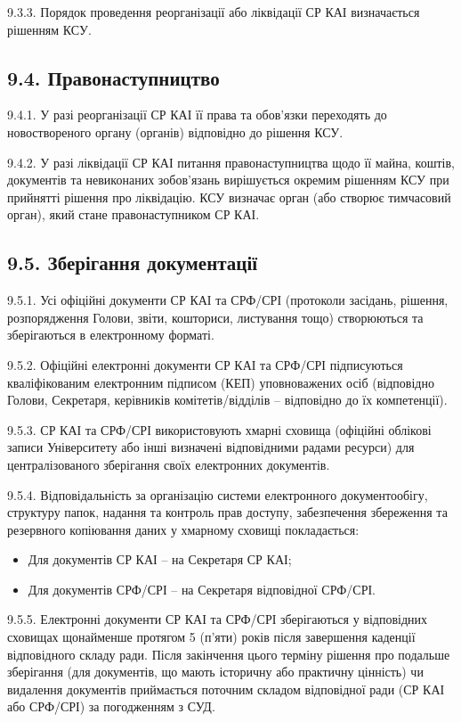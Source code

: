     9.3.3. Порядок проведення реорганізації або ліквідації СР КАІ визначається рішенням КСУ.

\subsection*{9.4. Правонаступництво}
    9.4.1. У разі реорганізації СР КАІ її права та обов'язки переходять до новоствореного органу (органів) відповідно до рішення КСУ.

    9.4.2. У разі ліквідації СР КАІ питання правонаступництва щодо її майна, коштів, документів та невиконаних зобов'язань вирішується окремим рішенням КСУ при прийнятті рішення про ліквідацію. КСУ визначає орган (або створює тимчасовий орган), який стане правонаступником СР КАІ.

\subsection*{9.5. Зберігання документації}
    9.5.1. Усі офіційні документи СР КАІ та СРФ/СРІ (протоколи засідань, рішення, розпорядження Голови, звіти, кошториси, листування тощо) створюються та зберігаються в електронному форматі.

    9.5.2. Офіційні електронні документи СР КАІ та СРФ/СРІ підписуються кваліфікованим електронним підписом (КЕП) уповноважених осіб (відповідно Голови, Секретаря, керівників комітетів/відділів – відповідно до їх компетенції).

    9.5.3. СР КАІ та СРФ/СРІ використовують хмарні сховища (офіційні облікові записи Університету або інші визначені відповідними радами ресурси) для централізованого зберігання своїх електронних документів.

    9.5.4. Відповідальність за організацію системи електронного документообігу, структуру папок, надання та контроль прав доступу, забезпечення збереження та резервного копіювання даних у хмарному сховищі покладається:

        \begin{itemize}
            \item Для документів СР КАІ – на Секретаря СР КАІ;
            \item Для документів СРФ/СРІ – на Секретаря відповідної СРФ/СРІ.
        \end{itemize}
    9.5.5. Електронні документи СР КАІ та СРФ/СРІ зберігаються у відповідних сховищах щонайменше протягом 5 (п'яти) років після завершення каденції відповідного складу ради. Після закінчення цього терміну рішення про подальше зберігання (для документів, що мають історичну або практичну цінність) чи видалення документів приймається поточним складом відповідної ради (СР КАІ або СРФ/СРІ) за погодженням з СУД. 